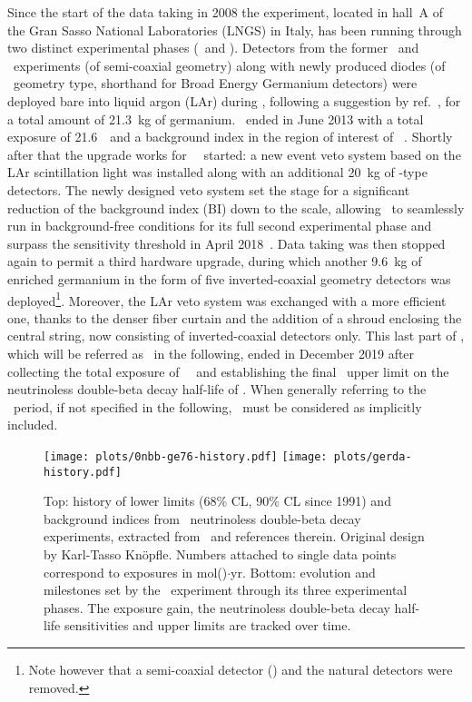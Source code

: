 Since the start of the data taking in 2008 the experiment, located in hall~A of the Gran
Sasso National Laboratories (LNGS) in Italy, has been running through two distinct
experimental phases (\phaseone\ and \phasetwo). Detectors from the former \hdm\ and \igex\
experiments (of semi-coaxial geometry) along with newly produced diodes (of \bege\
geometry type, shorthand for Broad Energy Germanium detectors) were deployed bare into
liquid argon (LAr) during \phaseone, following a suggestion by ref.~\cite{Heusser1995},
for a total amount of 21.3~kg of germanium. \phaseone\ ended in June 2013 with a total
exposure of 21.6~\kgyr\ and a background index in the region of interest of
\pIbi~\cite{Agostini2016}.  Shortly after that the upgrade works for \gerda\ \phasetwo\ started:
a new event veto system based on the LAr scintillation light was installed along with an
additional 20~kg of \bege-type detectors.  The newly designed veto system set the stage for a
significant reduction of the background index (BI) down to the \powctsper{-4} scale, allowing
\gerda\ to seamlessly run in background-free conditions for its full second experimental phase
and surpass the \powtenyr{26} sensitivity threshold in April 2018~\cite{Agostini2019a}.
Data taking was then stopped again to permit a third hardware upgrade, during which
another 9.6~kg of enriched germanium in the form of five inverted-coaxial geometry
detectors was deployed\footnote{Note however that a semi-coaxial detector (\ANG{1}) and
the natural \GTF{} detectors were removed.}. Moreover, the LAr veto system was exchanged
with a more efficient one, thanks to the denser fiber curtain and the addition of a shroud
enclosing the central string, now consisting of inverted-coaxial detectors only. This last
part of \phasetwo, which will be referred as \phasetwop\ in the following, ended in
December 2019 after collecting the total exposure of \fillme{fillme}~\kgyr\ and
establishing the final \gerda\ upper limit on the neutrinoless double-beta decay half-life
of \gerdafinallimit. When generally referring to the \phasetwo\ period, if not specified
in the following, \phasetwop\ must be considered as implicitly included.
\begin{figure}
  \centering
  \texttt{[image: plots/0nbb-ge76-history.pdf]}
  \texttt{[image: plots/gerda-history.pdf]}
  \caption{%
    Top: history of lower limits (68\% CL, 90\% CL since 1991) and background indices from
    \gesix\ neutrinoless double-beta decay experiments, extracted from~\cite{Fiorini1967,
    Bellotti1984, Caldwell1989, Reusser1991, Vasenko1989, Klapdor2001, Aalseth2002,
    Klapdor2004, Alvis2019, gerda-final} and references therein. Original design by Karl-Tasso
    Kn\"opfle.  Numbers attached to single data points correspond to exposures in
    mol(\gesix)$\cdot$yr. Bottom: evolution and milestones set by the \gerda\ experiment
    through its three experimental phases. The exposure gain, the neutrinoless double-beta
    decay half-life sensitivities and upper limits are tracked over time. \fillme{to be
    updated}
  }\label{img:exp:ge76-history}
\end{figure}
